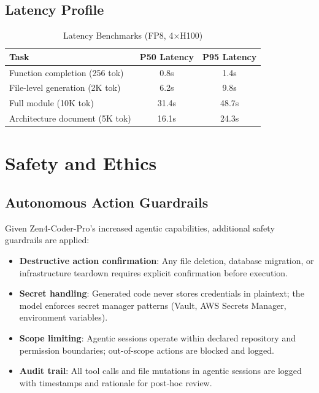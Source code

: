 \documentclass[11pt,a4paper]{article}
\begin{document}
\subsection{Latency Profile}

\begin{table}[H]
\centering
\caption{Latency Benchmarks (FP8, 4$\times$H100)}
\begin{tabular}{lcc}
\toprule
\textbf{Task} & \textbf{P50 Latency} & \textbf{P95 Latency} \\
\midrule
Function completion (256 tok) & 0.8s & 1.4s \\
File-level generation (2K tok) & 6.2s & 9.8s \\
Full module (10K tok) & 31.4s & 48.7s \\
Architecture document (5K tok) & 16.1s & 24.3s \\
\bottomrule
\end{tabular}
\end{table}

\section{Safety and Ethics}

\subsection{Autonomous Action Guardrails}

Given Zen4-Coder-Pro's increased agentic capabilities, additional safety guardrails are applied:

\begin{itemize}
  \item \textbf{Destructive action confirmation}: Any file deletion, database migration, or infrastructure teardown requires explicit confirmation before execution.
  \item \textbf{Secret handling}: Generated code never stores credentials in plaintext; the model enforces secret manager patterns (Vault, AWS Secrets Manager, environment variables).
  \item \textbf{Scope limiting}: Agentic sessions operate within declared repository and permission boundaries; out-of-scope actions are blocked and logged.
  \item \textbf{Audit trail}: All tool calls and file mutations in agentic sessions are logged with timestamps and rationale for post-hoc review.
\end{itemize}
\end{document}
